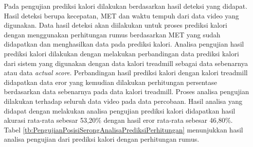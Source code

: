 Pada pengujian prediksi kalori dilakukan berdasarkan hasil deteksi yang didapat. Hasil deteksi berupa kecepatan, MET dan waktu tempuh dari data video yang digunakan. Data hasil deteksi akan diilakukan untuk proses prediksi kalori dengan menggunakan perhitungan rumus berdasarkan MET yang sudah didapatkan dan menghasilkan data pada prediksi kalori. Analisa pengujian hasil prediksi kalori dilakukan dengan melakukan perbandingan data prediksi kalori dari sistem yang digunakan dengan data kalori treadmill sebagai data sebenarnya atau data \emph{actual score}. Perbandingan hasil prediksi kalori dengan kalori treadmill didapatkan data eror yang kemudian dilakukan perhitungan persentase berdasarkan data sebenarnya pada data kalori treadmill. Proses analisa pengujian dilakukan terhadap seluruh data video pada data percobaan. Hasil analisa yang didapat dengan melakukan analisa pengujian prediksi kalori didapatkan hasil akurasi rata-rata sebesar 53,20\% dengan hasil eror rata-rata sebesar 46,80\%. Tabel \ref{tb:PengujianPosisiSerongAnalisaPrediksiPerhitungan} menunjukkan hasil analisa pengujian dari prediksi kalori dengan perhitungan rumus.

